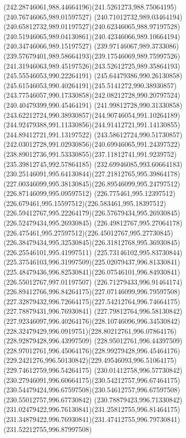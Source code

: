 {{		\curveto(242.28746061,988.44664196)(241.5261273,988.75064195)(240.76746065,989.01597527)
		\curveto(240.71012732,989.03464194)(240.65812732,989.01197527)(240.62346065,988.97197528)
		\curveto(240.51946065,989.04130861)(240.42346066,989.10664194)(240.34746066,989.15197527)
		\curveto(239.97146067,989.3733086)(239.57679401,989.58664193)(239.17546069,989.75997526)
		\curveto(241.31946063,989.45197526)(243.52612725,989.35864193)(245.55546053,990.22264191)
		\curveto(245.64479386,990.26130858)(245.61546053,990.40264191)(245.5141272,990.38930857)
		\curveto(243.77546057,990.17330858)(242.08212728,990.20797524)(240.40479399,990.45464191)
		\curveto(241.99812728,990.31330858)(243.62212724,990.38930857)(244.90746054,991.10264189)
		\curveto(244.92479388,991.11330856)(244.91412721,991.14130855)(244.89412721,991.13197522)
		\curveto(243.58612724,990.51730857)(242.03012728,991.02930856)(240.69946065,991.24397522)
		\curveto(238.89012736,991.53330855)(237.11812741,991.9239752)(235.39812745,992.57864185)
		\curveto(232.69946085,993.60664183)(230.25146091,995.64130844)(227.21812765,995.39864178)
		\curveto(227.00346099,995.38130845)(226.89546099,995.24797512)(226.87146099,995.09597512)
		\curveto(226.775461,995.12397512)(226.679461,995.15597512)(226.583461,995.18397512)
		\curveto(226.59412767,995.22264179)(226.57679434,995.26930845)(226.52479434,995.26930845)
		\curveto(226.49812767,995.27064178)(226.475461,995.27597512)(226.45012767,995.27730845)
		\curveto(226.38479434,995.32530845)(226.31812768,995.36930845)(226.25546101,995.41997511)
		\curveto(225.73146102,995.83730844)(225.37546103,996.31997509)(225.02079437,996.81330841)
		\curveto(225.48479436,996.82530841)(226.07546101,996.84930841)(226.55012767,997.01197507)
		\curveto(226.71279433,996.91464174)(226.89412766,996.84264175)(227.07146099,996.79597508)
		\curveto(227.32879432,996.72664175)(227.54212764,996.74664175)(227.78879431,996.76930841)
		\curveto(227.79812764,996.58130842)(227.92346097,996.40264176)(228.10746096,996.34530842)
		\curveto(228.32479429,996.0919751)(228.80212761,996.07864176)(228.92879428,996.43997509)
		\curveto(228.95012761,996.44397509)(228.97012761,996.45064176)(228.99279428,996.45464176)
		\curveto(229.2421276,996.50130842)(229.49546093,996.51064175)(229.74612759,996.54264175)
		\curveto(230.01412758,996.57730842)(230.27946091,996.60664175)(230.54212757,996.67464175)
		\curveto(230.54479424,996.67597508)(230.54612757,996.67597508)(230.55012757,996.67730842)
		\curveto(230.78879423,996.71330842)(231.02479422,996.76130841)(231.25812755,996.81464175)
		\curveto(231.34879422,996.76930841)(231.47412755,996.79730841)(231.52212755,996.87997508)
}}
